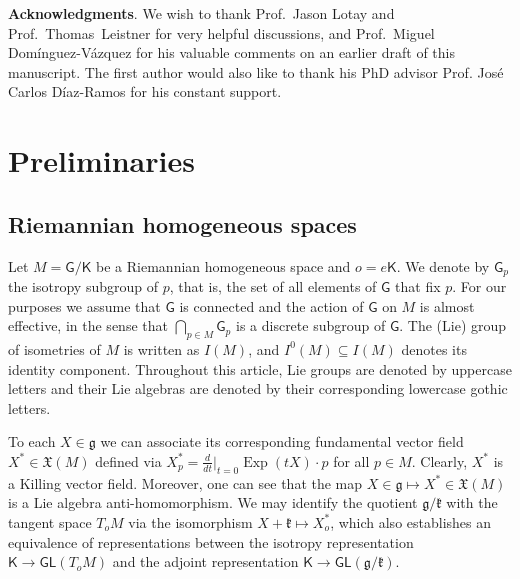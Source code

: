 \documentclass[11pt,a4paper,final]{amsart}
\newcommand{\s}{\mathsf}
\newcommand{\g}{\mathfrak}
\newcommand{\Exp}{\operatorname{Exp}}
\theoremstyle{definition}
\begin{document}
\textbf{Acknowledgments}. We wish to thank Prof.~Jason Lotay and Prof.~Thomas~Leistner for very helpful discussions, and Prof.~Miguel Domínguez-Vázquez for his valuable comments on an earlier draft of this manuscript.
The first author would also like to thank his PhD advisor Prof. Jos\'{e} Carlos D\'{i}az-Ramos for his constant support.



\section{Preliminaries}\label{sec:prelim}
	
\subsection{Riemannian homogeneous spaces}\label{subsec:homspaces}
	
Let $M=\mathsf{G}/\mathsf{K}$ be a Riemannian homogeneous space and $o=e\mathsf{K}$.
We denote by $\mathsf{G}_{p}$ the isotropy subgroup of $p$, that is, the set of all elements of $\s{G}$ that fix $p$.
For our purposes we assume that $\mathsf{G}$ is connected and the action of $\s{G}$ on $M$ is almost effective, in the sense that $\bigcap_{p\in M}\mathsf{G}_{p}$ is a discrete subgroup of $\s{G}$.
The (Lie) group of isometries of $M$ is written as $I(M)$, and $I^{0}(M)\subseteq I(M)$ denotes its identity component.
Throughout this article, Lie groups are denoted by uppercase letters and their Lie algebras are denoted by their corresponding lowercase gothic letters.
	
To each $X\in \g{g}$ we can associate its corresponding fundamental vector field $X^{*}\in\mathfrak{X}(M)$ defined via $X^{*}_{p}=\frac{d}{dt}\vert_{t=0}\Exp(tX)\cdot p$ for all $p\in M$.
Clearly, $X^{*}$ is a Killing vector field. 
Moreover, one can see that the map $X\in\g{g}\mapsto X^{*}\in\g{X}(M)$ is a Lie algebra anti-homomorphism.
We may identify the quotient $\g{g}/\g{k}$ with the tangent space $T_{o}M$ via the isomorphism $X+\g{k}\mapsto X^{*}_{o}$, which also establishes an equivalence of representations between the isotropy representation $\mathsf{K}\to\mathsf{GL}(T_{o}M)$ and the adjoint representation $\mathsf{K}\to \mathsf{GL}(\g{g}/\g{k})$.
	
\end{document}
